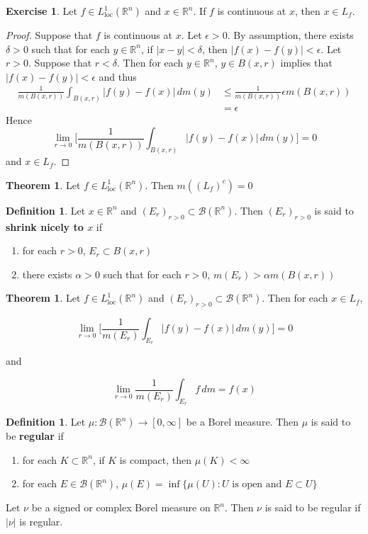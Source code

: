 \documentclass[12pt]{amsart}
\theoremstyle{definition}
\newtheorem{defn}[definition]{Definition}
\newtheorem{thm}[definition]{Theorem}
\newtheorem{ex}[definition]{Exercise}
\newcommand{\al}{\alpha}
\newcommand{\del}{\delta}
\newcommand{\ep}{\epsilon}
\newcommand{\R}{\mathbb{R}}
\newcommand{\MB}{\mathcal{B}}
\newcommand{\dm}{\, d m}
\newcommand{\RG}{[0,\infty]}
\newcommand{\Ll}{L^1_{\text{loc}}(\R^n)}
\newcommand{\lex}[1]{\label{ex:#1}}
\newcommand{\ld}[1]{\label{defn:#1}}
\begin{document}
	\begin{ex} \lex{00000} 
		Let $f \in \Ll$ and $x \in \R^n$. If $f$ is continuous at $x$, then $x \in L_f$.
	\end{ex}
	
	\begin{proof}
		Suppose that $f$ is continuous at $x$. Let $\ep > 0$. By assumption, there exists $\del >0$ such that for each $y \in \R^n$, if $|x-y|< \del$, then $|f(x)-f(y)| < \ep$. Let $r >0$. Suppose that $r< \del$. Then for each $y \in \R^n$, $y \in B(x,r)$ implies that $|f(x) - f(y)| < \ep$ and thus 
		\begin{align*}
			\frac{1}{m(B(x,r))}\int_{B(x,r)}|f(y) - f(x)|\dm(y)
			& \leq \frac{1}{m(B(x,r))} \ep m(B(x,r))\\
			&=\ep
		\end{align*}
		Hence $$\lim_{r \rightarrow 0} \bigg[ \frac{1}{m(B(x,r))}\int_{B(x,r)}|f(y) - f(x)|\dm(y)\bigg] =0$$ 
		and $x \in L_f$.
	\end{proof}
	
	\begin{thm}
		Let $f \in \Ll$. Then $m((L_f)^c) = 0$
	\end{thm}
	
	\begin{defn} \ld{00000} 
		Let $x \in \R^n$ and $(E_r)_{r>0} \subset \MB(\R^n)$. Then $(E_r)_{r>0}$ is said to \textbf{shrink nicely to $x$} if 
		
		\begin{enumerate}
			\item for each $r>0$, $E_r \subset B(x,r)$
			\item there exists $\al >0$ such that for each $r>0$, $m(E_r)> \al m(B(x,r))$
		\end{enumerate} 
	\end{defn}
	
	\begin{thm}
		Let $f \in \Ll$ and $(E_r)_{r>0} \subset \MB(\R^n)$. Then for each $x \in L_f$, 
		
		$$\lim_{r \rightarrow 0} \bigg[ \frac{1}{m(E_r)}\int_{E_r}|f(y) - f(x)|\dm(y)\bigg] =0$$
		
		and 
		
		$$\lim_{r \rightarrow 0}  \frac{1}{m(E_r)}\int_{E_r}f\dm = f(x)$$
	\end{thm}
	
	\begin{defn} \ld{00000} 
		Let $\mu:\MB(\R^n) \rightarrow \RG$ be a Borel measure. Then $\mu$ is said to be \textbf{regular} if 
		\begin{enumerate}
			\item for each $K \subset \R^n$, if $K$ is compact, then $\mu(K)< \infty$
			\item for each $E \in \MB(\R^n)$, $\mu(E) = \inf \{\mu(U): U \text{ is open and }E \subset U\}$
		\end{enumerate}
		
		Let $\nu$ be a signed or complex Borel measure on $\R^n$. Then $\nu$ is said to be regular if $|\nu|$ is regular.
	\end{defn}
	
\end{document}
